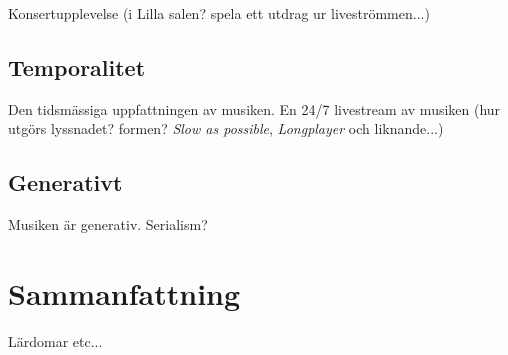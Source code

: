 \documentclass[11pt, twoside, a4paper]{article}
\begin{document}
\begin{multicols}{2}
Konsertupplevelse (i Lilla salen? spela ett utdrag ur liveströmmen...)

\subsection*{Temporalitet}
Den tidsmässiga uppfattningen av musiken. En 24/7 livestream av musiken (hur utgörs lyssnadet? formen? \emph{Slow as possible}, \emph{Longplayer} och liknande...)

\subsection*{Generativt}
Musiken är generativ. Serialism?

\section*{Sammanfattning}
Lärdomar etc...

\end{multicols}

\twocolumn

\printbibliography[type=book,title={Böcker}]
\printbibliography[type=article,title={Artiklar}]
\end{document}
